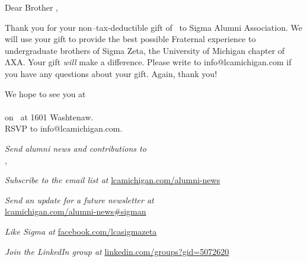 \documentclass{article}
\begin{document}
\vspace{1in}

Dear Brother \donorLastName,

Thank you for your non–tax-deductible gift of \donationAmount\ to Sigma Alumni
Association. We will use your gift to provide the best possible Fraternal
experience to undergraduate brothers of Sigma Zeta, the University of Michigan
chapter of ΛΧΑ. Your gift \emph{will} make a difference. Please write to
info@lcamichigan.com if you have any questions about your gift. Again, thank
you!

\vfill

{\fontsize{14}{22}\selectfont{}
  We hope to see you at\\[8bp]
  {\sffamily\fontsize{24}{24}\selectfont{}
    \MakeUppercase{\eventName}%
  }\\
  on \eventDate\ at 1601 Washtenaw.\\
  RSVP to info@lcamichigan.com.\par
}

\vspace{0.25in}

\emph{Send alumni news and contributions to\\}
\SigmaStreet, \SigmaCityStateAndZIP

\emph{Subscribe to the email list at} \url{lcamichigan.com/alumni-news}

\emph{Send an update for a future newsletter at\\}
\url{lcamichigan.com/alumni-news#sigman}

\emph{Like Sigma at} \url{facebook.com/lcasigmazeta}

\emph{Join the LinkedIn group at} \url{linkedin.com/groups?gid=5072620}

\iffalse
\newlength\windowMinX
\windowMinX0.375in
\begin{tikzpicture}[remember picture,overlay]
  \begin{scope}[lightgray]
    \draw
      ([shift={(\windowMinX, -\topWindowMinY)}]current page.north west) rectangle
      ([shift={(\windowMinX + \topWindowWidth, -(\topWindowMinY + \topWindowHeight))}]current page.north west);
    \draw
      ([shift={(\windowMinX, -\bottomWindowMinY)}]current page.north west) rectangle
      ([shift={(\windowMinX + \bottomWindowWidth, -(\bottomWindowMinY + \bottomWindowHeight))}]current page.north west);
  \end{scope}
\end{tikzpicture}
\fi
\end{document}
